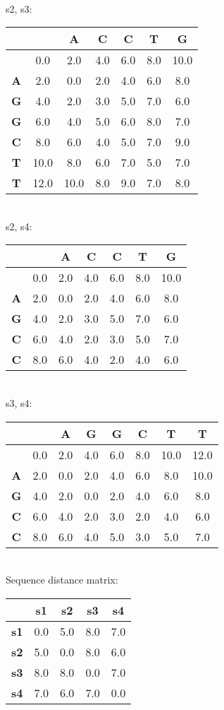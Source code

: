 \documentclass[a4paper,10pt,oneside,leqno]{scrartcl}
\begin{document}
\\[2mm]s2, s3: \\
\begin{tabular}{c|cccccc}
& \textbf{ } & \textbf{A} & \textbf{C} & \textbf{C} & \textbf{T} & \textbf{G}\\\hline
\textbf{ } & 0.0 & 2.0 & 4.0 & 6.0 & 8.0 & 10.0\\
\textbf{A} & 2.0 & 0.0 & 2.0 & 4.0 & 6.0 & 8.0\\
\textbf{G} & 4.0 & 2.0 & 3.0 & 5.0 & 7.0 & 6.0\\
\textbf{G} & 6.0 & 4.0 & 5.0 & 6.0 & 8.0 & 7.0\\
\textbf{C} & 8.0 & 6.0 & 4.0 & 5.0 & 7.0 & 9.0\\
\textbf{T} & 10.0 & 8.0 & 6.0 & 7.0 & 5.0 & 7.0\\
\textbf{T} & 12.0 & 10.0 & 8.0 & 9.0 & 7.0 & 8.0\\
\end{tabular}
\\[2mm]s2, s4: \\
\begin{tabular}{c|cccccc}
& \textbf{ } & \textbf{A} & \textbf{C} & \textbf{C} & \textbf{T} & \textbf{G}\\\hline
\textbf{ } & 0.0 & 2.0 & 4.0 & 6.0 & 8.0 & 10.0\\
\textbf{A} & 2.0 & 0.0 & 2.0 & 4.0 & 6.0 & 8.0\\
\textbf{G} & 4.0 & 2.0 & 3.0 & 5.0 & 7.0 & 6.0\\
\textbf{C} & 6.0 & 4.0 & 2.0 & 3.0 & 5.0 & 7.0\\
\textbf{C} & 8.0 & 6.0 & 4.0 & 2.0 & 4.0 & 6.0\\
\end{tabular}
\\[2mm]s3, s4: \\
\begin{tabular}{c|ccccccc}
& \textbf{ } & \textbf{A} & \textbf{G} & \textbf{G} & \textbf{C} & \textbf{T} & \textbf{T}\\\hline
\textbf{ } & 0.0 & 2.0 & 4.0 & 6.0 & 8.0 & 10.0 & 12.0\\
\textbf{A} & 2.0 & 0.0 & 2.0 & 4.0 & 6.0 & 8.0 & 10.0\\
\textbf{G} & 4.0 & 2.0 & 0.0 & 2.0 & 4.0 & 6.0 & 8.0\\
\textbf{C} & 6.0 & 4.0 & 2.0 & 3.0 & 2.0 & 4.0 & 6.0\\
\textbf{C} & 8.0 & 6.0 & 4.0 & 5.0 & 3.0 & 5.0 & 7.0\\
\end{tabular}
\\[2mm]Sequence distance matrix: 
\begin{tabular}{c|cccc}
& \textbf{s1} & \textbf{s2} & \textbf{s3} & \textbf{s4}\\\hline
\textbf{s1} & 0.0 & 5.0 & 8.0 & 7.0\\
\textbf{s2} & 5.0 & 0.0 & 8.0 & 6.0\\
\textbf{s3} & 8.0 & 8.0 & 0.0 & 7.0\\
\textbf{s4} & 7.0 & 6.0 & 7.0 & 0.0\\
\end{tabular} \\
\end{document}

